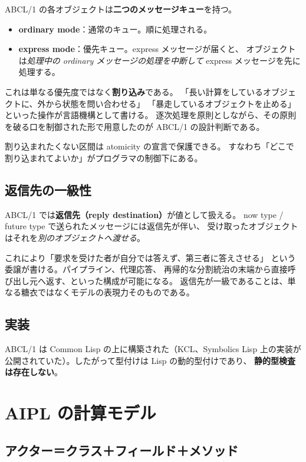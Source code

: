 \documentclass[11pt,a4paper]{ltjsarticle}
\theoremstyle{remark}
\begin{document}
ABCL/1 の各オブジェクトは\textbf{二つのメッセージキュー}を持つ。

\begin{itemize}
\item \textbf{ordinary mode}：通常のキュー。順に処理される。
\item \textbf{express mode}：優先キュー。express メッセージが届くと、
  オブジェクトは\emph{処理中の ordinary メッセージの処理を中断して}
  express メッセージを先に処理する。
\end{itemize}

これは単なる優先度ではなく\textbf{割り込み}である。
「長い計算をしているオブジェクトに、外から状態を問い合わせる」
「暴走しているオブジェクトを止める」といった操作が言語機構として書ける。
逐次処理を原則としながら、その原則を破る口を制御された形で用意したのが
ABCL/1 の設計判断である。

割り込まれたくない区間は atomicity の宣言で保護できる。
すなわち「どこで割り込まれてよいか」がプログラマの制御下にある。

\subsection{返信先の一級性}

ABCL/1 では\textbf{返信先（reply destination）}が値として扱える。
now type / future type で送られたメッセージには返信先が伴い、
受け取ったオブジェクトはそれを\emph{別のオブジェクトへ渡せる}。

これにより「要求を受けた者が自分では答えず、第三者に答えさせる」
という委譲が書ける。パイプライン、代理応答、
再帰的な分割統治の末端から直接呼び出し元へ返す、といった構成が可能になる。
返信先が一級であることは、単なる糖衣ではなくモデルの表現力そのものである。

\subsection{実装}

ABCL/1 は Common Lisp の上に構築された（KCL、Symbolics Lisp 上の実装が
公開されていた）。したがって型付けは Lisp の動的型付けであり、
\textbf{静的型検査は存在しない}。

\section{AIPL の計算モデル}

\subsection{アクター＝クラス＋フィールド＋メソッド}
\end{document}

